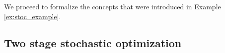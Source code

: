 \begin{example}











\end{example}

We proceed to formalize the concepts that were introduced in Example \ref{ex:stoc_example}.

\subsection{Two stage stochastic optimization}\label{sub:tsso}

